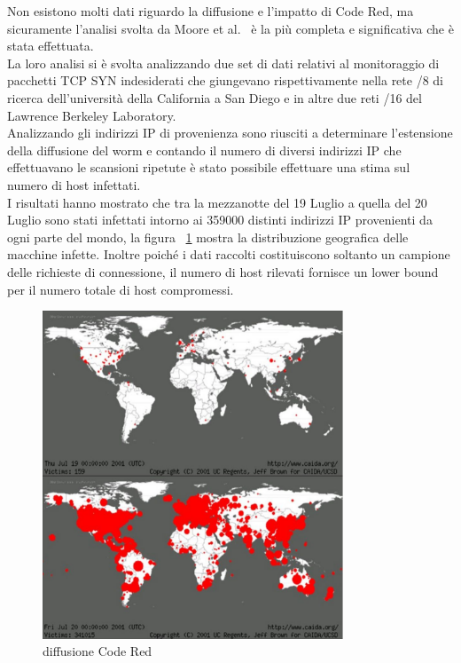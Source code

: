 Non esistono molti dati riguardo la diffusione e l’impatto di Code Red, ma sicuramente l’analisi svolta da Moore et al.~\cite{caida} è la più completa e significativa che è stata effettuata.\\
La loro analisi si è svolta analizzando due set di dati relativi al monitoraggio di pacchetti TCP SYN indesiderati che giungevano rispettivamente nella rete /8 di ricerca dell’università della California a San Diego e in altre due reti /16  del Lawrence Berkeley Laboratory.\\
Analizzando gli indirizzi IP di provenienza sono riusciti a determinare l’estensione della diffusione del worm e contando il numero di diversi indirizzi IP che effettuavano le scansioni ripetute è stato possibile effettuare una stima sul numero di host infettati.\\
I risultati hanno mostrato che tra la mezzanotte del 19 Luglio a quella del 20 Luglio sono stati infettati intorno ai 359000 distinti indirizzi IP provenienti da ogni parte del mondo, la figura ~\ref{spread} mostra la distribuzione geografica delle macchine infette. Inoltre poiché i dati raccolti costituiscono soltanto un campione delle richieste di connessione, il numero di host rilevati fornisce un lower bound per il numero totale di host compromessi.\\
\begin{figure}[!hbp]
\centering
\includegraphics[width=0.8\textwidth]{images/spread.eps}
\caption{diffusione Code Red}
\label{spread}
\end{figure}
